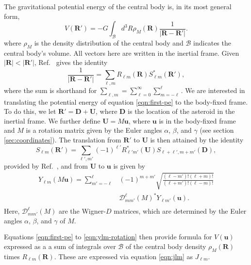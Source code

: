\documentclass[fleqn,usenatbib]{mnras}
\begin{document}
The gravitational potential energy of the central body is, in its most general form,
\begin{equation}
V(\bm R') = -G\int_\mathcal{B} d^3 R \rho_M(\bm R) \frac{1}{|\bm{R}-\bm{R'}|}.
\label{eqn:first-pe}
\end{equation}
where $\rho_M$ is the density distribution of the central body and $\mathcal{B}$ indicates the central body's volume. All vectors here are written in the inertial frame. Given $|\bm{R}| < |\bm{R'}|$, Ref.~\cite{Gelderen1998TheSO} gives the identity
\begin{equation}
  \frac{1}{|\bm R - \bm R'|} = \sum_{\ell, m} R_{\ell m}(\bm R) S_{\ell m}^*(\bm R'),
  \label{eqn:ylm-expansion}
\end{equation}
where the sum is shorthand for $\sum_{\ell, m} = \sum_{\ell = 0}^\infty \sum_{m=-\ell}^\ell$.
We are interested in translating the potential energy of equation \ref{eqn:first-pe} to the body-fixed frame. To do this, we let $\bm{R'} = \bm D + \bm U$, where $\bm D$ is the location of the asteroid in the inertial frame. We further define $\bm U = M\bm u$, where $\bm u$ is in the body-fixed frame and $M$ is a rotation matrix given by the Euler angles $\alpha$, $\beta$, and $\gamma$ (see section \ref{sec:coordinates}). The translation from $\bm {R'}$ to $\bm U$ is then attained by the identity 
\begin{equation}
  S_{\ell m}(\bm R') = \sum_{\ell', m'} (-1)^{\ell'}R^*_{\ell' m'}(\bm U)S_{\ell+\ell', m + m'} (\bm D),
  \label{eqn:ylm-translation}
\end{equation}  
provided by Ref.~\cite{Gelderen1998TheSO}, and from $\bm U$ to $\bm u$ is given by
\begin{equation}
  \begin{split}
    Y_{\ell m}(M\bm u) = \sum_{m'=-\ell}^\ell & (-1)^{m+m'}\sqrt{\frac{(\ell-m')!(\ell+m)!}{(\ell+m')!(\ell-m)!}} \\
    & \mathcal{D}^\ell_{mm'}(M)^* Y_{\ell m'}(\bm u).\\
  \end{split}
  \label{eqn:ylm-rotation}
\end{equation}
Here, $\mathcal{D}^\ell_{mm'}(M)$ are the Wigner-$D$ matrices, which are determined by the Euler angles $\alpha$, $\beta$, and $\gamma$ of $M$.

Equations \ref{eqn:first-pe} to \ref{eqn:ylm-rotation} then provide formula for $V(\bm u)$ expressed as a a sum of integrals over $\mathcal{B}$ of the central body density $\rho_M(\bm R)$ times $R_{\ell m}(\bm R)$. These are expressed via equation \ref{eqn:jlm} as $J_{\ell m}$.
\end{document}
